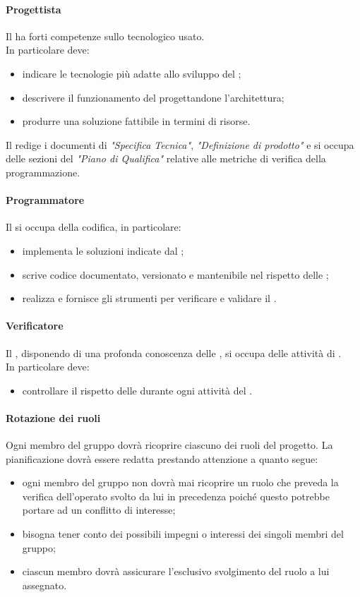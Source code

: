  \paragraph{Progettista}
 Il \PJ{} ha forti competenze sullo  tecnologico usato. \\
 In particolare deve: 
 \begin{itemize}
  \item indicare le tecnologie più adatte allo sviluppo del ;
  \item descrivere il funzionamento del  progettandone l'architettura;
  \item produrre una soluzione fattibile in termini di risorse.
 \end{itemize}
Il \PJ{} redige i documenti di \textit{"Specifica Tecnica"}, \textit{"Definizione di prodotto"} e si occupa delle sezioni del \textit{"Piano di Qualifica"} relative alle metriche di verifica della programmazione.
\newpage
\paragraph{Programmatore}
 Il \PR{} si occupa della codifica, in particolare:
 \begin{itemize}
  \item implementa le soluzioni indicate dal \PJ ;
  \item scrive codice documentato, versionato e mantenibile nel rispetto delle \NPdoc ;
  \item realizza e fornisce gli strumenti per verificare e validare il .
 \end{itemize}
 \paragraph{Verificatore}
 Il \VER , disponendo di una profonda conoscenza delle \NPdoc , si occupa delle attività di . \\
 In particolare deve: 
 \begin{itemize}
  \item controllare il rispetto delle \NPdoc durante ogni attività del .
 \end{itemize}
 \paragraph{Rotazione dei ruoli}
 Ogni membro del gruppo dovrà ricoprire ciascuno dei ruoli del progetto. La pianificazione dovrà essere redatta prestando attenzione a quanto segue:
 \begin{itemize}
 	\item ogni membro del gruppo non dovrà mai ricoprire un ruolo che preveda la verifica dell'operato svolto da lui in precedenza poiché questo potrebbe portare ad un conflitto di interesse;
 	\item bisogna tener conto dei possibili impegni o interessi dei singoli membri del gruppo;
 	\item ciascun membro dovrà assicurare l'esclusivo svolgimento del ruolo a lui assegnato.
 \end{itemize}  
